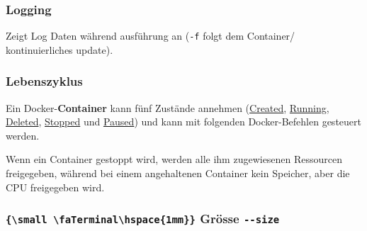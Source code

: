 \documentclass[
  10pt,
  a4paper,
  twocolumn]{article}
\newenvironment{Shaded}{}{}
\newcommand{\ExtensionTok}[1]{\textcolor[rgb]{0.84,0.23,0.29}{\textbf{#1}}}
\newcommand{\NormalTok}[1]{\textcolor[rgb]{0.14,0.16,0.18}{#1}}
\newcommand{\OperatorTok}[1]{\textcolor[rgb]{0.14,0.16,0.18}{#1}}
\begin{document}
\subsubsection{\texorpdfstring{{\small \faTerminal\hspace{1mm}}
Logging}{ Logging}}\label{logging}

Zeigt Log Daten während ausführung an (\texttt{-f} folgt dem Container/
kontinuierliches update).

\begin{Shaded}
\end{Shaded}

\subsubsection{Lebenszyklus}\label{lebenszyklus}

Ein Docker-\textbf{Container} kann fünf Zustände annehmen (\ul{Created},
\ul{Running}, \ul{Deleted}, \ul{Stopped} und \ul{Paused}) und kann mit
folgenden Docker-Befehlen gesteuert werden.

\resizebox{\columnwidth}{!}{
  
}

\begin{tcolorbox}[enhanced jigsaw, colframe=quarto-callout-note-color-frame, bottomrule=.15mm, colback=white, left=2mm, toprule=.15mm, arc=.35mm, coltitle=black, opacityback=0, rightrule=.15mm, title=\textcolor{quarto-callout-note-color}{\faInfo}\hspace{0.5em}{Unterschied \emph{Stopped} und \emph{Paused}}, colbacktitle=quarto-callout-note-color!10!white, opacitybacktitle=0.6, toptitle=1mm, bottomtitle=1mm, titlerule=0mm, leftrule=.75mm, breakable]

Wenn ein Container gestoppt wird, werden alle ihm zugewiesenen
Ressourcen freigegeben, während bei einem angehaltenen Container kein
Speicher, aber die CPU freigegeben wird.

\end{tcolorbox}

\subsubsection{\texorpdfstring{\texttt{\{\textbackslash{}small\ \textbackslash{}faTerminal\textbackslash{}hspace\{1mm\}\}}
Grösse
\texttt{-\/-size}}{\{\textbackslash small \textbackslash faTerminal\textbackslash hspace\{1mm\}\} Grösse -\/-size}}\label{small-faterminalhspace1mm-gruxf6sse---size}
\end{document}
